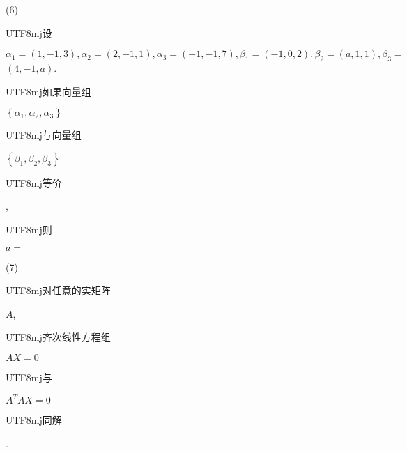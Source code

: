 \documentclass[10pt]{article}
\begin{document}
(6) \begin{CJK}{UTF8}{mj}设\end{CJK} $\alpha_{1}=(1,-1,3), \alpha_{2}=(2,-1,1), \alpha_{3}=(-1,-1,7), \beta_{1}=(-1,0,2), \beta_{2}=(a, 1,1), \beta_{3}=$ $(4,-1, a)$. \begin{CJK}{UTF8}{mj}如果向量组\end{CJK} $\left\{\alpha_{1}, \alpha_{2}, \alpha_{3}\right\}$ \begin{CJK}{UTF8}{mj}与向量组\end{CJK} $\left\{\beta_{1}, \beta_{2}, \beta_{3}\right\}$ \begin{CJK}{UTF8}{mj}等价\end{CJK}, \begin{CJK}{UTF8}{mj}则\end{CJK} $a=$

(7) \begin{CJK}{UTF8}{mj}对任意的实矩阵\end{CJK} $A$, \begin{CJK}{UTF8}{mj}齐次线性方程组\end{CJK} $A X=0$ \begin{CJK}{UTF8}{mj}与\end{CJK} $A^{T} A X=0$ \begin{CJK}{UTF8}{mj}同解\end{CJK}.
\end{document}

